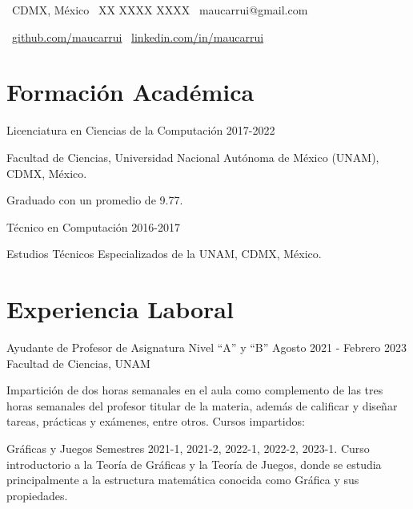 \documentclass{curriculum-vitae}
\begin{document}
  \hypersetup{pageanchor=false}


  \vspace{1em}

  \contactPersonal%
      {\faMapMarker \ CDMX, México}
      {\faMobile \ XX XXXX XXXX}
      {\faEnvelopeO \ maucarrui@gmail.com}

  \vspace{1em}

  \contactSocial%
      {\faGithub
       \ \href{https://github.com/maucarrui}{github.com/maucarrui}}
      {\faLinkedinSquare
       \ \href{https://linkedin.com/in/maucarrui}{linkedin.com/in/maucarrui}}

  \section{Formación Académica}
    \datedsubsection%
        {Licenciatura en Ciencias de la Computación}
        {2017-2022}

        Facultad de Ciencias, Universidad Nacional Autónoma de México (UNAM),
        CDMX, México.

        Graduado con un promedio de 9.77.

        \textcolor{Blue}{}

    \datedsubsection%
      {Técnico en Computación}
      {2016-2017}
      
      Estudios Técnicos Especializados de la UNAM, CDMX, México.
      

  \section{Experiencia Laboral}
    \experiencesubsection%
        {Ayudante de Profesor de Asignatura Nivel ``A'' y ``B''}
        {Agosto 2021 - Febrero 2023}
        {Facultad de Ciencias, UNAM}

        Impartición de dos horas semanales en el aula como complemento de las
        tres horas semanales del profesor titular de la materia, además de
        calificar y diseñar tareas, prácticas y exámenes, entre otros. Cursos
        impartidos:

        \vspace{0.5em}

        \course%
            {Gráficas y Juegos}
            {Semestres 2021-1, 2021-2, 2022-1, 2022-2, 2023-1.}
            {Curso introductorio a la Teor\'ia de Gráficas y la Teor\'ia de
              Juegos, donde se estudia principalmente a la estructura
              matem\'atica conocida como Gr\'afica y sus propiedades.}
\end{document}
